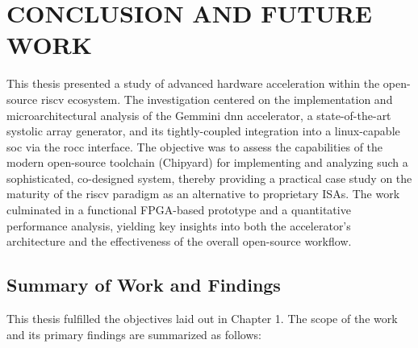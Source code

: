 \chapter{CONCLUSION AND FUTURE WORK}
\label{chap:conclusion_and_future_work}

This thesis presented a study of advanced hardware acceleration within the open-source \acrshort{riscv} ecosystem. The investigation centered on the implementation and microarchitectural analysis of the Gemmini \acrshort{dnn} accelerator, a state-of-the-art systolic array generator, and its tightly-coupled integration into a \acrshort{linux}-capable \acrfull{soc} via the \acrfull{rocc} interface. The objective was to assess the capabilities of the modern open-source toolchain (Chipyard) for implementing and analyzing such a sophisticated, co-designed system, thereby providing a practical case study on the maturity of the \acrshort{riscv} paradigm as an alternative to proprietary ISAs. The work culminated in a functional FPGA-based prototype and a quantitative performance analysis, yielding key insights into both the accelerator's architecture and the effectiveness of the overall open-source workflow.

\section{Summary of Work and Findings}
This thesis fulfilled the objectives laid out in Chapter 1. The scope of the work and its primary findings are summarized as follows:

